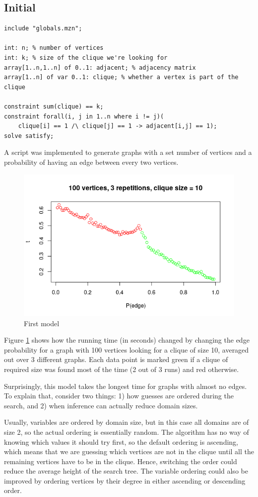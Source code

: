 \documentclass{article}
\theoremstyle{definition}
\begin{document}
\subsection{Initial}
\begin{lstlisting}
include "globals.mzn";

int: n; % number of vertices
int: k; % size of the clique we're looking for
array[1..n,1..n] of 0..1: adjacent; % adjacency matrix
array[1..n] of var 0..1: clique; % whether a vertex is part of the clique

constraint sum(clique) == k;
constraint forall(i, j in 1..n where i != j)(
    clique[i] == 1 /\ clique[j] == 1 -> adjacent[i,j] == 1);
solve satisfy;
\end{lstlisting}
A script was implemented to generate graphs with a set number of vertices and a probability of having an edge between every two vertices.
\begin{figure}
  \includegraphics[scale=0.5]{max_clique.png}
  \caption{First model}
  \label{fig:initial_max_clique}
\end{figure}
Figure \ref{fig:initial_max_clique} shows how the running time (in seconds) changed by changing the edge probability for a graph with 100 vertices looking for a clique of size 10, averaged out over 3 different graphs. Each data point is marked green if a clique of required size was found most of the time (2 out of 3 runs) and red otherwise.

Surprisingly, this model takes the longest time for graphs with almost no edges. To explain that, consider two things: 1) how guesses are ordered during the search, and 2) when inference can actually reduce domain sizes.

Usually, variables are ordered by domain size, but in this case all domains are of size 2, so the actual ordering is essentially random. The algorithm has no way of knowing which values it should try first, so the default ordering is ascending, which means that we are guessing which vertices are not in the clique until all the remaining vertices have to be in the clique. Hence, switching the order could reduce the average height of the search tree. The variable ordering could also be improved by ordering vertices by their degree in either ascending or descending order.
\end{document}
